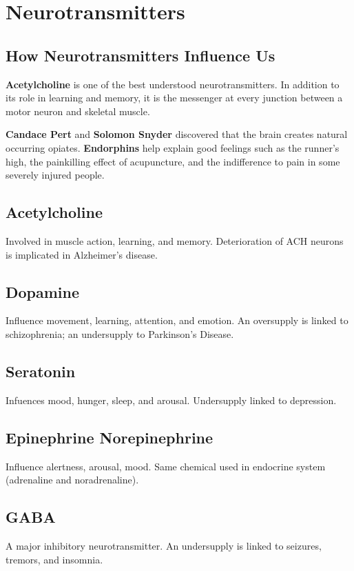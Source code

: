 \documentclass[12pt]{article}
\begin{document}
\section*{Neurotransmitters}
\subsection*{How Neurotransmitters Influence Us}
\textbf{Acetylcholine} is one of the best understood neurotransmitters. In addition to its role in learning and memory, it is the messenger at every junction between a motor neuron and skeletal muscle. 

{\bf Candace Pert} and {\bf Solomon Snyder} discovered that the brain creates natural occurring opiates. \textbf{Endorphins} help explain good feelings such as the runner's high, the painkilling effect of acupuncture, and the indifference to pain in some severely injured people. 

\subsection*{Acetylcholine}
Involved in muscle action, learning, and memory. Deterioration of ACH neurons is implicated in Alzheimer's disease. 

\subsection*{Dopamine}
Influence movement, learning, attention, and emotion. An oversupply is linked to schizophrenia; an undersupply to Parkinson's Disease.

\subsection*{Seratonin}
Infuences mood, hunger, sleep, and arousal. Undersupply linked to depression.

\subsection*{Epinephrine Norepinephrine}
Influence alertness, arousal, mood. Same chemical used in endocrine system (adrenaline and noradrenaline).

\subsection*{GABA}
A major inhibitory neurotransmitter. An undersupply is linked to seizures, tremors, and insomnia.
\end{document}

